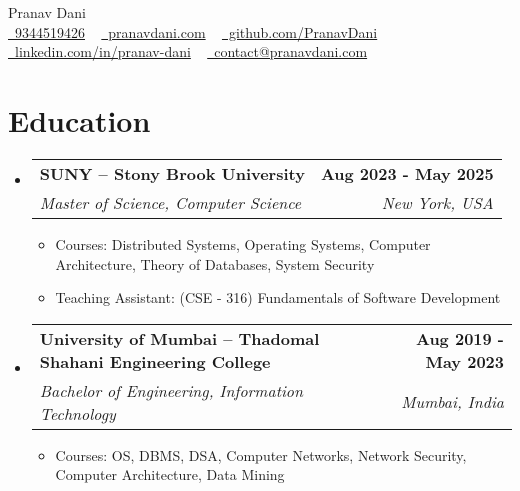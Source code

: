 \documentclass[letterpaper,11pt]{article}
\makeatletter
\newcommand{\resumeItem}[1]{
  \item\small{
    {#1 \vspace{-2pt}}
  }
}
\newcommand{\resumeSubheading}[4]{
  \vspace{-2pt}\item
    \begin{tabular*}{1.0\textwidth}[t]{l@{\extracolsep{\fill}}r}
      \vspace{-2pt}\textbf{#1} & \textbf{\small #2} \\
      \textit{\small#3} & \textit{\small #4} \\
    \end{tabular*}\vspace{-7pt}
}
\newcommand{\resumeSubHeadingListStart}{\begin{itemize}[leftmargin=0.0in, label={}]}
\newcommand{\resumeSubHeadingListEnd}{\end{itemize}}
\newcommand{\resumeItemListStart}{\begin{itemize}}
\newcommand{\resumeItemListEnd}{\end{itemize}\vspace{-5pt}}
\makeatother
\begin{document}

\begin{center}
    {\huge Pranav Dani} \\ \vspace{4pt}
    \small
    \href{tel:+19344529426}{\raisebox{-0.2\height}\ 9344519426} ~
    \faGlobe \href{https://pranavdani.com}{\raisebox{-0.1\height}\ pranavdani.com} ~
    \faGithub \href{https://github.com/PranavDani}{\raisebox{-0.2\height}\ github.com/PranavDani} ~
    \faLinkedin \href{https://linkedin.com/in/pranav-dani}{\raisebox{-0.2\height}\ linkedin.com/in/pranav-dani} ~
    \faEnvelope \href{mailto:contact@pranavdani.com}{\raisebox{-0.2\height}\  contact@pranavdani.com}
    \vspace{-10pt}
\end{center}


\section{Education}
\resumeSubHeadingListStart
        \resumeSubheading
            {SUNY -- Stony Brook University}{Aug 2023 - May 2025}
            {Master of Science, Computer Science }{New York, USA}
            \resumeItemListStart
                \resumeItem{Courses: Distributed Systems, Operating Systems, Computer Architecture, Theory of Databases, System Security}
                \vspace{-2pt}
                \resumeItem{Teaching Assistant: (CSE - 316) Fundamentals of Software Development}
            \resumeItemListEnd
\vspace{-5pt}

        \resumeSubheading
            {University of Mumbai -- Thadomal Shahani Engineering College}{Aug 2019 - May 2023}
            {Bachelor of Engineering, Information Technology}{Mumbai, India}
            \resumeItemListStart
                \resumeItem{Courses: OS, DBMS, DSA, Computer Networks, Network Security, Computer Architecture, Data Mining}
            \resumeItemListEnd
    \resumeSubHeadingListEnd
\vspace{-15pt}
\end{document}
